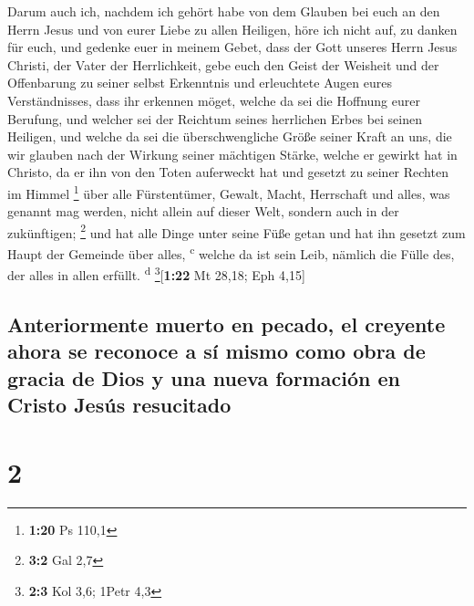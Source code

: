  Darum auch ich, nachdem ich gehört habe von dem Glauben
bei euch an den Herrn Jesus und von eurer Liebe zu allen Heiligen,
 höre ich nicht auf, zu danken für euch, und gedenke euer
in meinem Gebet,  dass der Gott unseres Herrn Jesus
Christi, der Vater der Herrlichkeit, gebe euch den Geist der Weisheit
und der Offenbarung zu seiner selbst Erkenntnis  und
erleuchtete Augen eures Verständnisses, dass ihr erkennen möget, welche
da sei die Hoffnung eurer Berufung, und welcher sei der Reichtum seines
herrlichen Erbes bei seinen Heiligen,  und welche da sei
die überschwengliche Größe seiner Kraft an uns, die wir glauben nach der
Wirkung seiner mächtigen Stärke,  welche er gewirkt hat
in Christo, da er ihn von den Toten auferweckt hat und gesetzt zu seiner
Rechten im Himmel \footnote{\textbf{1:20} Ps 110,1}  über
alle Fürstentümer, Gewalt, Macht, Herrschaft und alles, was genannt mag
werden, nicht allein auf dieser Welt, sondern auch in der zukünftigen;
\footnote{\textbf{3:2} Gal 2,7}  und hat alle Dinge unter
seine Füße getan und hat ihn gesetzt zum Haupt der Gemeinde über alles,
\textsuperscript{c}  welche da ist sein Leib, nämlich die
Fülle des, der alles in allen erfüllt. \textsuperscript{d}
\footnote{\textbf{2:3} Kol 3,6; 1Petr 4,3}{[}\textbf{1:22} Mt 28,18; Eph
4,15{]}

\hypertarget{anteriormente-muerto-en-pecado-el-creyente-ahora-se-reconoce-a-suxed-mismo-como-obra-de-gracia-de-dios-y-una-nueva-formaciuxf3n-en-cristo-jesuxfas-resucitado}{%
\subsection{Anteriormente muerto en pecado, el creyente ahora se
reconoce a sí mismo como obra de gracia de Dios y una nueva formación en
Cristo Jesús
resucitado}\label{anteriormente-muerto-en-pecado-el-creyente-ahora-se-reconoce-a-suxed-mismo-como-obra-de-gracia-de-dios-y-una-nueva-formaciuxf3n-en-cristo-jesuxfas-resucitado}}

\hypertarget{section-1}{%
\section{2}\label{section-1}}

